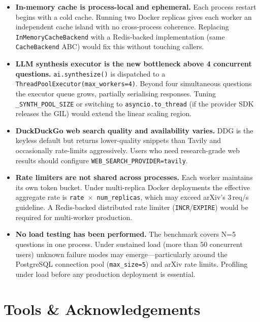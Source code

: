 \documentclass[11pt,a4paper]{article}
\begin{document}
\begin{itemize}[itemsep=4pt]
  \item \textbf{In-memory cache is process-local and ephemeral.} Each process restart
    begins with a cold cache. Running two Docker replicas gives each worker an
    independent cache island with no cross-process coherence. Replacing
    \texttt{InMemoryCacheBackend} with a Redis-backed implementation (same
    \texttt{CacheBackend} ABC) would fix this without touching callers.

  \item \textbf{LLM synthesis executor is the new bottleneck above 4 concurrent questions.}
    \texttt{ai.synthesize()} is dispatched to a
    \texttt{ThreadPoolExecutor(max\_workers=4)}. Beyond four simultaneous questions
    the executor queue grows, partially serialising responses. Tuning
    \texttt{\_SYNTH\_POOL\_SIZE} or switching to \texttt{asyncio.to\_thread}
    (if the provider SDK releases the GIL) would extend the linear scaling region.

  \item \textbf{DuckDuckGo web search quality and availability varies.} DDG is the
    keyless default but returns lower-quality snippets than Tavily and occasionally
    rate-limits aggressively. Users who need research-grade web results should
    configure \texttt{WEB\_SEARCH\_PROVIDER=tavily}.

  \item \textbf{Rate limiters are not shared across processes.} Each worker maintains
    its own token bucket. Under multi-replica Docker deployments the effective
    aggregate rate is \texttt{rate $\times$ num\_replicas}, which may exceed arXiv's
    3\,req/s guideline. A Redis-backed distributed rate limiter
    (\texttt{INCR}/\texttt{EXPIRE}) would be required for multi-worker production.

  \item \textbf{No load testing has been performed.} The benchmark covers N=5 questions
    in one process. Under sustained load (more than 50 concurrent users) unknown failure
    modes may emerge---particularly around the PostgreSQL connection pool
    (\texttt{max\_size=5}) and arXiv rate limits. Profiling under load before any
    production deployment is essential.
\end{itemize}

\section{Tools \& Acknowledgements}\label{sec:tools}
\end{document}
